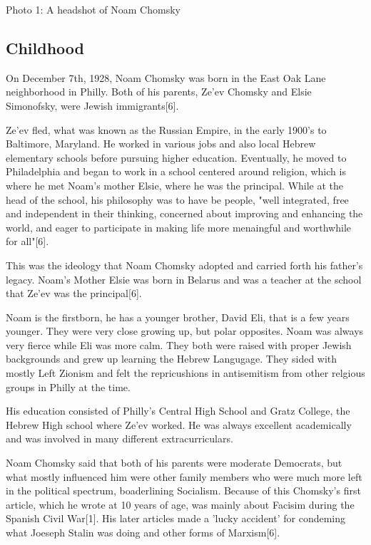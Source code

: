 \documentclass[conference]{IEEEtran}
\begin{document}
Photo 1: A headshot of Noam Chomsky

\subsection{Childhood}
On December 7th, 1928, Noam Chomsky was born in the East Oak Lane neighborhood in Philly. Both of his parents, Ze'ev Chomsky and Elsie Simonofsky, were Jewish immigrants[6]. 

Ze'ev fled, what was known as the Russian Empire, in the early 1900's to Baltimore, Maryland. He worked in various jobs and also local Hebrew elementary schools before pursuing higher education. Eventually, he moved to Philadelphia and began to work in a school centered around religion, which is where he met Noam's mother Elsie, where he was the principal. While at the head of the school, his philosophy was to have be people, "well integrated, free and independent in their thinking, concerned about improving and enhancing the world, and eager to participate in making life more menaingful and worthwhile for all"[6].

This was the ideology that Noam Chomsky adopted and carried forth his father's legacy. Noam's Mother Elsie was born in Belarus and was a teacher at the school that Ze'ev was the principal[6].

Noam is the firstborn, he has a younger brother, David Eli, that is a few years younger. They were very close growing up, but polar opposites. Noam was always very fierce while Eli was more calm. They both were raised with proper Jewish backgrounds and grew up learning the Hebrew Langugage. They sided with mostly Left Zionism and felt the repricushions in antisemitism from other relgious groups in Philly at the time. 

His education consisted of Philly's Central High School and Gratz College, the Hebrew High school where Ze'ev worked. He was always excellent academically and was involved in many different extracurriculars. 

Noam Chomsky said that both of his parents were moderate Democrats, but what mostly influenced him were other family members who were much more left in the political spectrum, boaderlining Socialism. Because of this Chomsky's first article, which he wrote at 10 years of age, was mainly about Facisim during the Spanish Civil War[1]. His later articles made a 'lucky accident' for condeming what Joeseph Stalin was doing and other forms of Marxism[6]. \newline
\end{document}
